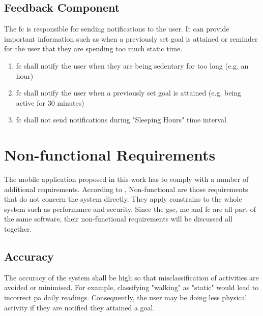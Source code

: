     \subsection{Feedback Component}
    \label{section:feedback-component}
    The \gls{fc} is responsible for sending notifications to the user. It can provide important information such as when a previously set goal is attained or reminder for the user that they are spending too much static time.
    \begin{enumerate}
        \item \gls{fc} shall notify the user when they are being sedentary for too long (e.g. an hour)
        
        \item \gls{fc} shall notify the user when a previously set goal is attained (e.g. being active for 30 minutes)
        
        \item \gls{fc} shall not send notifications during "Sleeping Hours" time interval
    \end{enumerate}

\section{Non-functional Requirements}
The mobile application proposed in this work has to comply with a number of additional requirements. According to \citet[87]{sommerville2010}, Non-functional are those requirements that do not concern the system directly. They apply constrains to the whole system such as performance and security.  Since the \gls{gsc}, \gls{mc} and \gls{fc} are all part of the same software, their non-functional requirements will be discussed all together.
    
    
    \subsection{Accuracy}
    The accuracy of the system shall be high so that misclassification of activities are avoided or minimised. For example, classifying "walking" as "static" would lead to incorrect \gls{pa} daily readings. Consequently, the user may be doing less physical activity if they are notified they attained a goal.
    
